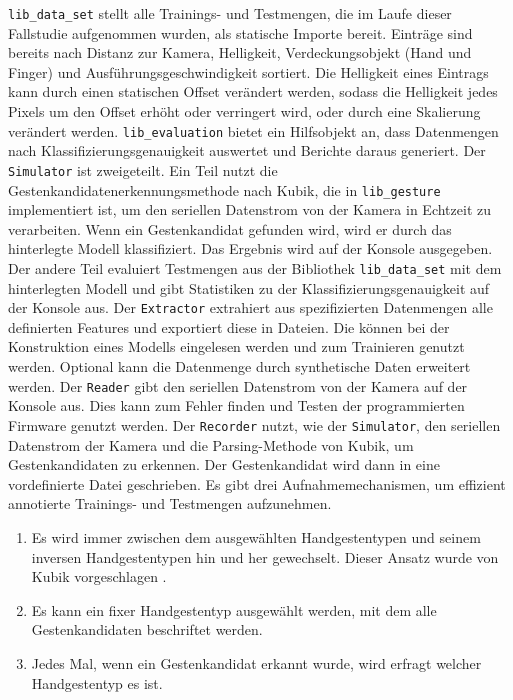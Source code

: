 \texttt{lib\_data\_set} stellt alle Trainings- und Testmengen, die im Laufe dieser Fallstudie aufgenommen wurden, als statische Importe bereit. Einträge sind bereits nach Distanz zur Kamera,
Helligkeit, Verdeckungsobjekt (Hand und Finger) und Ausführungsgeschwindigkeit sortiert. Die Helligkeit eines Eintrags kann durch einen statischen Offset verändert werden, sodass die Helligkeit jedes
Pixels um den Offset erhöht oder verringert wird, oder durch eine Skalierung verändert werden.
\newline
\newline
\texttt{lib\_evaluation} bietet ein Hilfsobjekt an, dass Datenmengen nach Klassifizierungsgenauigkeit auswertet und Berichte daraus generiert.
\newline
\newline
Der \texttt{Simulator} ist zweigeteilt. Ein Teil nutzt die Gestenkandidatenerkennungsmethode nach Kubik, die in \texttt{lib\_gesture} implementiert ist, um den seriellen Datenstrom von der Kamera in
Echtzeit zu verarbeiten. Wenn ein Gestenkandidat gefunden wird, wird er durch das hinterlegte Modell klassifiziert. Das Ergebnis wird auf der Konsole ausgegeben. Der andere Teil evaluiert
Testmengen aus der Bibliothek \texttt{lib\_data\_set} mit dem hinterlegten Modell und gibt Statistiken zu der Klassifizierungsgenauigkeit auf der Konsole aus.
\newline
\newline
Der \texttt{Extractor} extrahiert aus spezifizierten Datenmengen alle definierten Features und exportiert diese in Dateien. Die können bei der Konstruktion eines Modells eingelesen werden und zum Trainieren
genutzt werden. Optional kann die Datenmenge durch synthetische Daten erweitert werden.
\newline
\newline
Der \texttt{Reader} gibt den seriellen Datenstrom von der Kamera auf der Konsole aus. Dies kann zum Fehler finden und Testen der programmierten Firmware genutzt werden.
\newline
\newline
Der \texttt{Recorder} nutzt, wie der \texttt{Simulator}, den seriellen Datenstrom der Kamera und die Parsing-Methode von Kubik, um Gestenkandidaten zu erkennen.
Der Gestenkandidat wird dann in eine vordefinierte Datei geschrieben. Es gibt drei Aufnahmemechanismen, um effizient annotierte Trainings- und Testmengen aufzunehmen.
\begin{enumerate}
    \item Es wird immer zwischen dem ausgewählten Handgestentypen und seinem inversen Handgestentypen hin und her gewechselt. Dieser Ansatz wurde von Kubik vorgeschlagen \cite{venzkeArticle}.
    \item Es kann ein fixer Handgestentyp ausgewählt werden, mit dem alle Gestenkandidaten beschriftet werden.
    \item Jedes Mal, wenn ein Gestenkandidat erkannt wurde, wird erfragt welcher Handgestentyp es ist.
\end{enumerate}